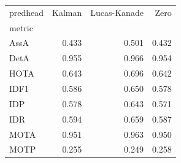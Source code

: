 \begin{tabular}{lrrr}
\toprule
predhead & Kalman & Lucas-Kanade & Zero \\
metric &  &  &  \\
\midrule
AssA & 0.433 & 0.501 & 0.432 \\
DetA & 0.955 & 0.966 & 0.954 \\
HOTA & 0.643 & 0.696 & 0.642 \\
IDF1 & 0.586 & 0.650 & 0.578 \\
IDP & 0.578 & 0.643 & 0.571 \\
IDR & 0.594 & 0.659 & 0.587 \\
MOTA & 0.951 & 0.963 & 0.950 \\
MOTP & 0.255 & 0.249 & 0.258 \\
\bottomrule
\end{tabular}
